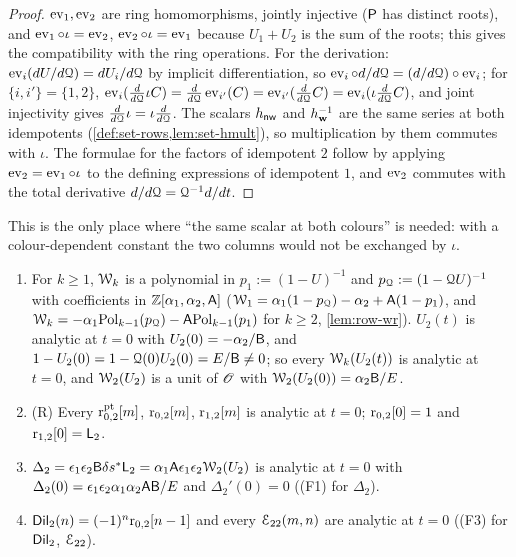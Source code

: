 \begin{proof}
$\operatorname{ev}_1,\operatorname{ev}_2$ are ring homomorphisms, jointly injective ($\mathsf{P}$ has distinct roots), and $\operatorname{ev}_1\circ\iota = \operatorname{ev}_2$, $\operatorname{ev}_2\circ\iota = \operatorname{ev}_1$ because $U_1+U_2$ is the sum of the roots; this gives the compatibility with the ring operations. For the derivation: $\operatorname{ev}_i(dU/d\mathcal{Q}) = dU_i/d\mathcal{Q}$ by implicit differentiation, so $\operatorname{ev}_i\circ d/d\mathcal{Q} = (d/d\mathcal{Q})\circ\operatorname{ev}_i$; for $\{i,i'\} = \{1,2\}$, $\operatorname{ev}_i(\tfrac{d}{d\mathcal{Q}}\iota C) = \tfrac{d}{d\mathcal{Q}}\operatorname{ev}_{i'}(C) = \operatorname{ev}_{i'}(\tfrac{d}{d\mathcal{Q}}C) = \operatorname{ev}_i(\iota\tfrac{d}{d\mathcal{Q}}C)$, and joint injectivity gives $\tfrac{d}{d\mathcal{Q}}\iota = \iota\tfrac{d}{d\mathcal{Q}}$. The scalars $h_{\mathsf{nw}}$ and $h_{\mathbf{w}}^{-1}$ are the same series at both idempotents (\cref{def:set-rows,lem:set-hmult}), so multiplication by them commutes with $\iota$. The formulae for the factors of idempotent $2$ follow by applying $\operatorname{ev}_2 = \operatorname{ev}_1\circ\iota$ to the defining expressions of idempotent $1$, and $\operatorname{ev}_2$ commutes with the total derivative $d/d\mathcal{Q} = \mathcal{Q}^{-1}d/dt$.
\end{proof}

This is the only place where ``the same scalar at both colours'' is needed: with a colour-dependent constant the two columns would not be exchanged by $\iota$.

\begin{lem}
\label{lem:lea-reg}
\begin{enumerate}
\item For $k\geq 1$, $\mathcal{W}_k$ is a polynomial in $p_1 := (1-U)^{-1}$ and $p_{\mathcal{Q}} := (1-\mathcal{Q} U)^{-1}$ with coefficients in $\mathbb{Z}[\alpha_1,\alpha_2,\mathsf{A}]$ ($\mathcal{W}_1 = \alpha_1(1-p_{\mathcal{Q}}) - \alpha_2 + \mathsf{A}(1-p_1)$, and $\mathcal{W}_k = -\alpha_1\mathrm{Pol}_{k-1}(p_{\mathcal{Q}}) - \mathsf{A}\mathrm{Pol}_{k-1}(p_1)$ for $k\geq 2$, \cref{lem:row-wr}). $U_2(t)$ is analytic at $t = 0$ with $U_2(0) = -\alpha_2/\mathsf{B}$, and $1-U_2(0) = 1-\mathcal{Q}(0)U_2(0) = E/\mathsf{B}\neq 0$; so every $\mathcal{W}_k(U_2(t))$ is analytic at $t = 0$, and $\mathcal{W}_2(U_2)$ is a unit of $\mathscr{O}$ with $\mathcal{W}_2(U_2(0)) = \alpha_2\mathsf{B}/E$.
\item (R) Every $\mathrm{r}^{\mathrm{pt}}_{0,2}[m]$, $\mathrm{r}_{0,2}[m]$, $\mathrm{r}_{1,2}[m]$ is analytic at $t = 0$; $\mathrm{r}_{0,2}[0] = 1$ and $\mathrm{r}_{1,2}[0] = \mathsf{L}_2$.
\item $\Delta_2 = \epsilon_1\epsilon_2\mathsf{B}\delta s^{\ast}\mathsf{L}_2 = \alpha_1\mathsf{A}\epsilon_1\epsilon_2\mathcal{W}_2(U_2)$ is analytic at $t = 0$ with $\Delta_2(0) = \epsilon_1\epsilon_2\alpha_1\alpha_2\mathsf{A}\mathsf{B}/E$ and $\Delta_2'(0) = 0$ ((F1) for $\Delta_2$).
\item $\mathsf{Dil}_2(n) = (-1)^n\mathrm{r}_{0,2}[n-1]$ and every $\mathcal{E}_{22}(m,n)$ are analytic at $t = 0$ ((F3) for $\mathsf{Dil}_2$, $\mathcal{E}_{22}$).
\end{enumerate}
\end{lem}

